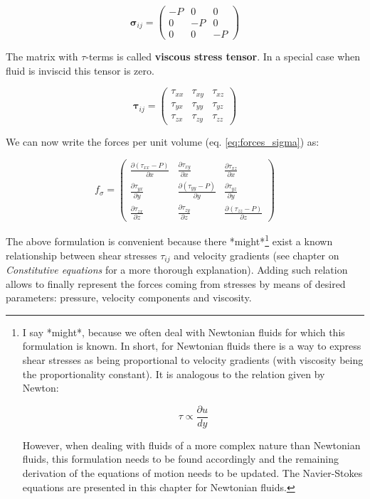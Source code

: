 \begin{equation}
\bm{\sigma}_{ij} = \left(
\begin{matrix} 
-P & 0 & 0  \\
0 & -P & 0 \\
0 & 0 & -P 
\end{matrix}
\right)
\end{equation}

The matrix with $\tau$-terms is called \textbf{viscous stress tensor}. In a special case when fluid is inviscid this tensor is zero.

\begin{equation}
\bm{\tau}_{ij} = 
\left(
\begin{matrix} 
\tau_{xx} & \tau_{xy} & \tau_{xz} \\
\tau_{yx} & \tau_{yy} & \tau_{yz} \\
\tau_{zx} & \tau_{zy} & \tau_{zz}
\end{matrix}
\right)
\end{equation}

We can now write the forces per unit volume (eq. \ref{eq:forces_sigma}) as:

\begin{equation} \label{eq:forces_sigma_2}
f_{\sigma} = \left(
\begin{matrix} 
\frac{\partial (\tau_{xx} - P)}{\partial x} & \frac{\partial \tau_{xy}}{\partial x} & \frac{\partial \tau_{xz}}{\partial x} \\
\frac{\partial \tau_{yx}}{\partial y} & \frac{\partial (\tau_{yy} - P)}{\partial y} & \frac{\partial \tau_{yz}}{\partial y} \\
\frac{\partial \tau_{zx}}{\partial z} & \frac{\partial \tau_{zy}}{\partial z} & \frac{\partial (\tau_{zz} - P)}{\partial z}
\end{matrix}
\right)
\end{equation}

The above formulation is convenient because there *might*\footnote{I say *might*, because we often deal with Newtonian fluids for which this formulation is known. In short, for Newtonian fluids there is a way to express shear stresses as being proportional to velocity gradients (with viscosity being the proportionality constant). It is analogous to the relation given by Newton:

\begin{equation}
\tau \propto \frac{\partial u}{dy}
\end{equation}

However, when dealing with fluids of a more complex nature than Newtonian fluids, this formulation needs to be found accordingly and the remaining derivation of the equations of motion needs to be updated. The Navier-Stokes equations are presented in this chapter for Newtonian fluids.} exist a known relationship between shear stresses $\tau_{ij}$ and velocity gradients (see chapter on \textit{Constitutive equations} for a more thorough explanation). Adding such relation allows to finally represent the forces coming from stresses by means of desired parameters: pressure, velocity components and viscosity.




